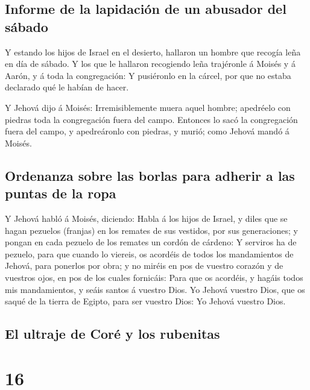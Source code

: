 \hypertarget{informe-de-la-lapidaciuxf3n-de-un-abusador-del-suxe1bado}{%
\subsection{Informe de la lapidación de un abusador del
sábado}\label{informe-de-la-lapidaciuxf3n-de-un-abusador-del-suxe1bado}}

 Y estando los hijos de Israel en el desierto, hallaron un
hombre que recogía leña en día de sábado.  Y los que le
hallaron recogiendo leña trajéronle á Moisés y á Aarón, y á toda la
congregación:  Y pusiéronlo en la cárcel, por que no estaba
declarado qué le habían de hacer.

 Y Jehová dijo á Moisés: Irremisiblemente muera aquel
hombre; apedréelo con piedras toda la congregación fuera del campo.
 Entonces lo sacó la congregación fuera del campo, y
apedreáronlo con piedras, y murió; como Jehová mandó á Moisés.

\hypertarget{ordenanza-sobre-las-borlas-para-adherir-a-las-puntas-de-la-ropa}{%
\subsection{Ordenanza sobre las borlas para adherir a las puntas de la
ropa}\label{ordenanza-sobre-las-borlas-para-adherir-a-las-puntas-de-la-ropa}}

 Y Jehová habló á Moisés, diciendo:  Habla á
los hijos de Israel, y diles que se hagan pezuelos (franjas) en los
remates de sus vestidos, por sus generaciones; y pongan en cada pezuelo
de los remates un cordón de cárdeno:  Y serviros ha de
pezuelo, para que cuando lo viereis, os acordéis de todos los
mandamientos de Jehová, para ponerlos por obra; y no miréis en pos de
vuestro corazón y de vuestros ojos, en pos de los cuales fornicáis:
 Para que os acordéis, y hagáis todos mis mandamientos, y
seáis santos á vuestro Dios.  Yo Jehová vuestro Dios, que
os saqué de la tierra de Egipto, para ser vuestro Dios: Yo Jehová
vuestro Dios.

\hypertarget{el-ultraje-de-coruxe9-y-los-rubenitas}{%
\subsection{El ultraje de Coré y los
rubenitas}\label{el-ultraje-de-coruxe9-y-los-rubenitas}}

\hypertarget{section-15}{%
\section{16}\label{section-15}}

